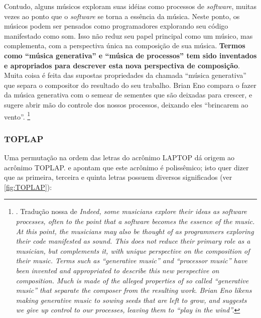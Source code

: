 \begin{citacao}
Contudo, alguns músicos exploram suas idéias como processos de \emph{software}, muitas vezes ao ponto que o \emph{software} se torna a essência da música. Neste ponto, os músicos podem ser pensados como programadores explorando seu código manifestado como som. Isso não reduz seu papel principal como um músico, mas complementa, com a perspectiva única na composição de sua música. \textbf{Termos como ``música generativa'' e ``música de processos'' tem sido inventados e apropriados para descrever esta nova perspectiva de composição}. Muita coisa é feita das supostas propriedades da chamada ``música generativa'' que separa o compositor do resultado do seu trabalho. Brian Eno compara o fazer da música generativa com o semear de sementes que são deixadas para crescer, e sugere abrir mão do controle dos nossos processos, deixando eles ``brincarem ao vento''. \footnote{. Tradução nossa de \emph{Indeed, some musicians explore their ideas as software processes, often to the point that a software becomes the essence of the music. At this point, the musicians may also be thought of as programmers exploring their code manifested as sound. This does not reduce their primary role as a musician, but complements it, with unique perspective on the composition of their music. Terms such as “generative music” and “processor music” have been invented and appropriated to describe this new perspective on composition. Much is made of the alleged properties of so called “generative music” that separate the composer from the resulting work. Brian Eno likens making generative music to sowing seeds that are left to grow, and suggests we give up control to our processes, leaving them to “play in the wind”.}}
\end{citacao}

\subsubsection{TOPLAP}

Uma permutação na ordem das letras do acrônimo LAPTOP dá origem ao acrônimo TOPLAP.  e  apontam que este acrônimo é polissêmico; isto quer dizer que as primeira, terceira  e quinta letras possuem diversos significados (ver \autoref{fig:TOPLAP}):

\begin{citacao}
\end{citacao}

